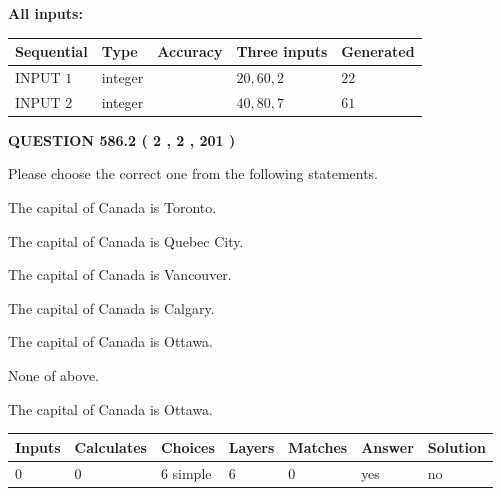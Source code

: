 \documentclass[12pt]{article}
\begin{document}
   
   
   
\noindent\vspace{0.1in}\hspace{-0.08in} {\textbf{\Large{All inputs: }}}
   
   
  
  
\noindent\begin{tabular}{|l|l|l|l|l|}
\hline
 Sequential & Type & Accuracy & Three inputs & Generated \\ 
\hline
 
 
  INPUT $  1 $ & integer &  & $
 20
 , 
 60
 , 
 2
 $ & $ 22 $ 
 \\  \hline  
 
 
  INPUT $  2 $ & integer &  & $
 40
 , 
 80
 , 
 7
 $ & $ 61 $ 
 \\  \hline  
 \end{tabular}
   
   
  
\vspace{0.2in}
  
{\textbf{\Large{QUESTION
586.2 
 ( 2 , 2 , 201 )
}}}
  
  
Please choose the correct one from the following statements.
 
 
The capital of Canada is Toronto.
 
 
The capital of Canada is Quebec City.
 
 
The capital of Canada is Vancouver.
 
 
The capital of Canada is Calgary.
 
 
The capital of Canada is Ottawa.
 
 
 None of above.
 
 
\noindent{}
 
 
The capital of Canada is Ottawa.
 
 
\noindent{}
 
 
   
   
   
   
\noindent\begin{tabular}{|l|l|l|l|l|l|l|}
 \hline
Inputs & Calculates & Choices & Layers & Matches & Answer & Solution \\ \hline
 0  & 
 0  & 
 6
  simple  
  & 
 6  & 
 0  & 
  yes & 
  no 
  \\ \hline
 \end{tabular}
   
\end{document}
